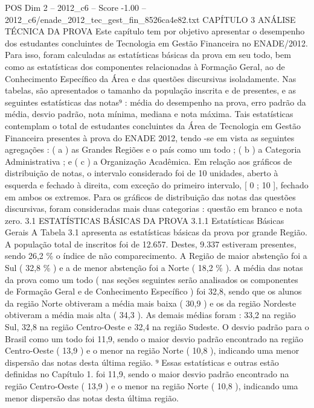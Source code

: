 \begin{textsample}{POS Dim 2 – 2012\_c6 – Score -1.00 – 2012\_c6/enade\_2012\_tec\_gest\_fin\_8526ca4e82.txt}  \label{ex:f2_pos_253}
CAPÍTULO 3 ANÁLISE TÉCNICA DA PROVA Este capítulo tem por objetivo apresentar o desempenho dos estudantes concluintes de Tecnologia em Gestão Financeira no ENADE/2012.
Para isso, foram calculadas as estatísticas básicas da prova em seu todo, bem como as estatísticas dos componentes relacionadas à Formação Geral, ao de Conhecimento Específico da Área e das questões discursivas isoladamente.
Nas tabelas, são apresentados o tamanho da população inscrita e de presentes, e as seguintes estatísticas das notas⁹ : média do desempenho na prova, erro padrão da média, desvio padrão, nota mínima, mediana e nota máxima.
Tais estatísticas contemplam o total de estudantes concluintes da Área de Tecnologia em Gestão Financeira presentes à prova do ENADE 2012, tendo -se em vista as seguintes agregações : ( a ) as Grandes Regiões e o país como um todo ; ( b ) a Categoria Administrativa ; e ( c ) a Organização Acadêmica.
Em relação aos gráficos de distribuição de notas, o intervalo considerado foi de 10 unidades, aberto à esquerda e fechado à direita, com exceção do primeiro intervalo, [ 0 ; 10 ], fechado em ambos os extremos.
Para os gráficos de distribuição das notas das questões discursivas, foram consideradas mais duas categorias : questão em branco e nota zero. 3.1 ESTATÍSTICAS BÁSICAS DA PROVA 3.1.1 Estatísticas Básicas Gerais A Tabela 3.1 apresenta as estatísticas básicas da prova por grande Região.
A população total de inscritos foi de 12.657.
Destes, 9.337 estiveram presentes, sendo 26,2 \% o índice de não comparecimento.
A Região de maior abstenção foi a Sul ( 32,8 \% ) e a de menor abstenção foi a Norte ( 18,2 \% ).
A média das notas da prova como um todo ( nas seções seguintes serão analisados os componentes de Formação Geral e de Conhecimento Específico ) foi 32,8, sendo que os alunos da região Norte obtiveram a média mais baixa ( 30,9 ) e os da região Nordeste obtiveram a média mais alta ( 34,3 ).
As demais médias foram : 33,2 na região Sul, 32,8 na região Centro-Oeste e 32,4 na região Sudeste.
O desvio padrão para o Brasil como um todo foi 11,9, sendo o maior desvio padrão encontrado na região Centro-Oeste ( 13,9 ) e o menor na região Norte ( 10,8 ), indicando uma menor dispersão das notas desta última região. ⁹ Essas estatísticas e outras estão definidas no Capítulo 1. foi 11,9, sendo o maior desvio padrão encontrado na região Centro-Oeste ( 13,9 ) e o menor na região Norte ( 10,8 ), indicando uma menor dispersão das notas desta última região.

\end{textsample}
